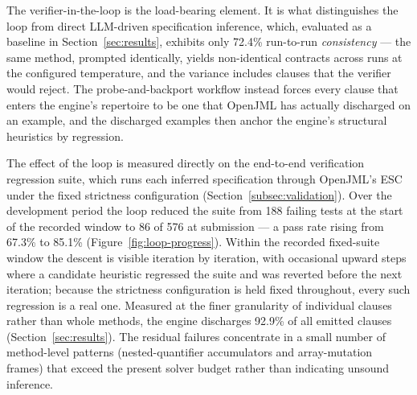 The verifier-in-the-loop is the load-bearing element. It is what distinguishes the loop from direct LLM-driven specification inference, which, evaluated as a baseline in Section~\ref{sec:results}, exhibits only 72.4\% run-to-run \emph{consistency} --- the same method, prompted identically, yields non-identical contracts across runs at the configured temperature, and the variance includes clauses that the verifier would reject. The probe-and-backport workflow instead forces every clause that enters the engine's repertoire to be one that OpenJML has actually discharged on an example, and the discharged examples then anchor the engine's structural heuristics by regression.

The effect of the loop is measured directly on the end-to-end verification regression suite, which runs each inferred specification through OpenJML's ESC under the fixed strictness configuration (Section~\ref{subsec:validation}). Over the development period the loop reduced the suite from 188 failing tests at the start of the recorded window to 86 of 576 at submission --- a pass rate rising from 67.3\% to 85.1\% (Figure~\ref{fig:loop-progress}). Within the recorded fixed-suite window the descent is visible iteration by iteration, with occasional upward steps where a candidate heuristic regressed the suite and was reverted before the next iteration; because the strictness configuration is held fixed throughout, every such regression is a real one. Measured at the finer granularity of individual clauses rather than whole methods, the engine discharges 92.9\% of all emitted clauses (Section~\ref{sec:results}). The residual failures concentrate in a small number of method-level patterns (nested-quantifier accumulators and array-mutation frames) that exceed the present solver budget rather than indicating unsound inference.

